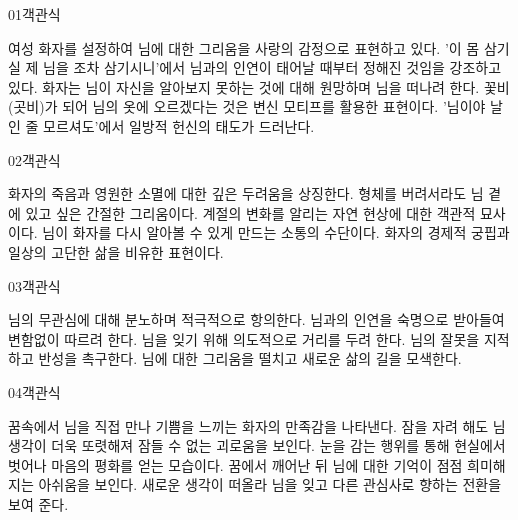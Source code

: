 \documentclass[fs85,seriesWit]{korfarm-base}
\begin{document}
\kfBeginMC
\begin{kfQBlock}{01}{객관식}
\begin{kfChoices}
\kfChoice 여성 화자를 설정하여 님에 대한 그리움을 사랑의 감정으로 표현하고 있다.
\kfChoice '이 몸 삼기실 제 님을 조차 삼기시니'에서 님과의 인연이 태어날 때부터 정해진 것임을 강조하고 있다.
\kfChoice 화자는 님이 자신을 알아보지 못하는 것에 대해 원망하며 님을 떠나려 한다.
\kfChoice 꽃비(곳비)가 되어 님의 옷에 오르겠다는 것은 변신 모티프를 활용한 표현이다.
\kfChoice '님이야 날인 줄 모르셔도'에서 일방적 헌신의 태도가 드러난다.
\end{kfChoices}
\end{kfQBlock}

\begin{kfQBlock}{02}{객관식}
\begin{kfChoices}
\kfChoice 화자의 죽음과 영원한 소멸에 대한 깊은 두려움을 상징한다.
\kfChoice 형체를 버려서라도 님 곁에 있고 싶은 간절한 그리움이다.
\kfChoice 계절의 변화를 알리는 자연 현상에 대한 객관적 묘사이다.
\kfChoice 님이 화자를 다시 알아볼 수 있게 만드는 소통의 수단이다.
\kfChoice 화자의 경제적 궁핍과 일상의 고단한 삶을 비유한 표현이다.
\end{kfChoices}
\end{kfQBlock}

\begin{kfQBlock}{03}{객관식}
\begin{kfChoices}
\kfChoice 님의 무관심에 대해 분노하며 적극적으로 항의한다.
\kfChoice 님과의 인연을 숙명으로 받아들여 변함없이 따르려 한다.
\kfChoice 님을 잊기 위해 의도적으로 거리를 두려 한다.
\kfChoice 님의 잘못을 지적하고 반성을 촉구한다.
\kfChoice 님에 대한 그리움을 떨치고 새로운 삶의 길을 모색한다.
\end{kfChoices}
\end{kfQBlock}

\begin{kfQBlock}{04}{객관식}
\begin{kfChoices}
\kfChoice 꿈속에서 님을 직접 만나 기쁨을 느끼는 화자의 만족감을 나타낸다.
\kfChoice 잠을 자려 해도 님 생각이 더욱 또렷해져 잠들 수 없는 괴로움을 보인다.
\kfChoice 눈을 감는 행위를 통해 현실에서 벗어나 마음의 평화를 얻는 모습이다.
\kfChoice 꿈에서 깨어난 뒤 님에 대한 기억이 점점 희미해지는 아쉬움을 보인다.
\kfChoice 새로운 생각이 떠올라 님을 잊고 다른 관심사로 향하는 전환을 보여 준다.
\end{kfChoices}
\end{kfQBlock}
\end{document}
